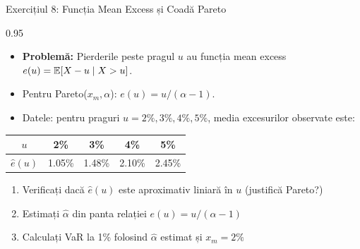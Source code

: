 \documentclass[9pt, aspectratio=169, t]{beamer}
\begin{document}
\begin{frame}{Exercițiul 8: Funcția Mean Excess și Coadă Pareto}
\begin{cminipage}{0.95\textwidth}
    \begin{itemize}\setlength{\itemsep}{0pt}
        \item \textbf{Problemă:} Pierderile peste pragul $u$ au funcția mean excess $e(u) = \mathbb{E}[X - u \mid X > u]$.
        \item Pentru Pareto($x_m, \alpha$): $e(u) = u / (\alpha - 1)$.
        \item Datele: pentru praguri $u = 2\%, 3\%, 4\%, 5\%$, media excesurilor observate este:
    \end{itemize}
    \renewcommand{\arraystretch}{1.1}
    \begin{tabular}{ccccc}
    \toprule
    $u$ & 2\% & 3\% & 4\% & 5\% \\
    \midrule
    $\hat{e}(u)$ & 1.05\% & 1.48\% & 2.10\% & 2.45\% \\
    \bottomrule
    \end{tabular}
    \begin{enumerate}\setlength{\itemsep}{0pt}
        \item Verificați dacă $\hat{e}(u)$ este aproximativ liniară în $u$ (justifică Pareto?)
        \item Estimați $\hat{\alpha}$ din panta relației $e(u) = u/(\alpha-1)$
        \item Calculați VaR la 1\% folosind $\hat{\alpha}$ estimat și $x_m = 2\%$
    \end{enumerate}
\end{cminipage}
\end{frame}
\end{document}
